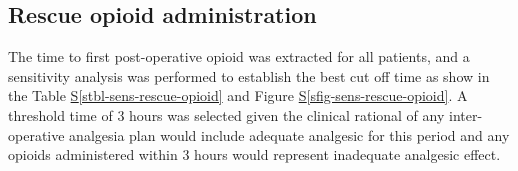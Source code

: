 \documentclass[
  letterpaper,
  DIV=11,
  numbers=noendperiod]{scrreprt}
\newcommand*\quartosfigref[1]{Figure \hyperref[#1]{S\ref{#1}}}
\newcommand*\quartostblref[1]{Table \hyperref[#1]{S\ref{#1}}}
\begin{document}
\subsection{Rescue opioid
administration}\label{sec-sm-sensitivity-opioid}

The time to first post-operative opioid was extracted for all patients,
and a sensitivity analysis was performed to establish the best cut off
time as show in the \quartostblref{stbl-sens-rescue-opioid} and
\quartosfigref{sfig-sens-rescue-opioid}. A threshold time of 3 hours was
selected given the clinical rational of any inter-operative analgesia
plan would include adequate analgesic for this period and any opioids
administered within 3 hours would represent inadequate analgesic effect.

\begin{stbl}


\caption{\label{stbl-sens-rescue-opioid}TODO: caption to be supplied by
the authors.}

\end{stbl}%
\end{document}
